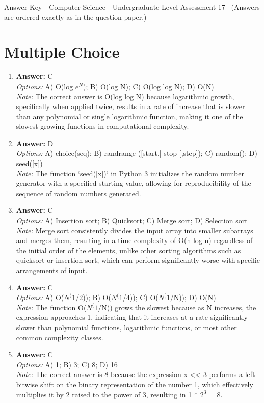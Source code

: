 \documentclass[12pt]{article}
\begin{document}
\begin{center}
Answer Key - Computer Science - Undergraduate Level Assessment 17 \
\small (Answers are ordered exactly as in the question paper.)
\end{center}

\section*{Multiple Choice}
\begin{enumerate}[label=\arabic*.]
\item \textbf{Answer:} C
\\ \textit{Options:} A) O(log $e^N$); B) O(log N); C) O(log log N); D) O(N)
\\ \textit{Note:} The correct answer is O(log log N) because logarithmic growth, specifically when applied twice, results in a rate of increase that is slower than any polynomial or single logarithmic function, making it one of the slowest-growing functions in computational complexity.
\item \textbf{Answer:} D
\\ \textit{Options:} A) choice(seq); B) randrange ([start,] stop [,step]); C) random(); D) seed([x])
\\ \textit{Note:} The function `seed([x])` in Python 3 initializes the random number generator with a specified starting value, allowing for reproducibility of the sequence of random numbers generated.
\item \textbf{Answer:} C
\\ \textit{Options:} A) Insertion sort; B) Quicksort; C) Merge sort; D) Selection sort
\\ \textit{Note:} Merge sort consistently divides the input array into smaller subarrays and merges them, resulting in a time complexity of O(n log n) regardless of the initial order of the elements, unlike other sorting algorithms such as quicksort or insertion sort, which can perform significantly worse with specific arrangements of input.
\item \textbf{Answer:} C
\\ \textit{Options:} A) O($N^(1$/2)); B) O($N^(1$/4)); C) O($N^(1$/N)); D) O(N)
\\ \textit{Note:} The function O($N^(1$/N)) grows the slowest because as N increases, the expression approaches 1, indicating that it increases at a rate significantly slower than polynomial functions, logarithmic functions, or most other common complexity classes.
\item \textbf{Answer:} C
\\ \textit{Options:} A) 1; B) 3; C) 8; D) 16
\\ \textit{Note:} The correct answer is 8 because the expression x \textless{}\textless{} 3 performs a left bitwise shift on the binary representation of the number 1, which effectively multiplies it by 2 raised to the power of 3, resulting in 1 * $2^3$ = 8.
\end{enumerate}
\end{document}
